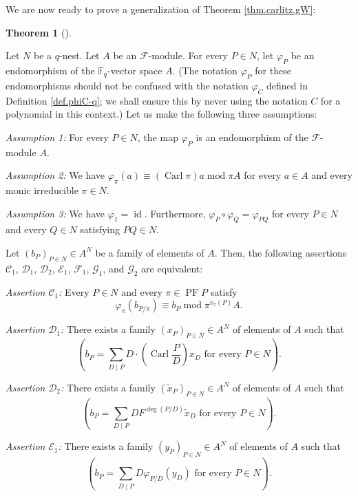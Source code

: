\documentclass[numbers=enddot,12pt,final,onecolumn,notitlepage]{scrartcl}%
\theoremstyle{definition}
\newtheorem{theo}{Theorem}[section]
\newenvironment{theorem}[1][]
{\begin{theo}[#1]\begin{leftbar}}
{\end{leftbar}\end{theo}}
\let\sumnonlimits\sum
\renewcommand{\sum}{\sumnonlimits\limits}
\begin{document}
We are now ready to prove a generalization of Theorem \ref{thm.carlitz.gW}:


\begin{theorem}
\label{thm.F.gW}Let $N$ be a $q$-nest. Let $A$ be an $\mathcal{F}$-module. For
every $P\in N$, let $\varphi_{P}$ be an endomorphism of the $\mathbb{F}_{q}%
$-vector space $A$. (The notation $\varphi_{P}$ for these endomorphisms should
not be confused with the notation $\varphi_{C}$ defined in Definition
\ref{def.phiC-q}; we shall ensure this by never using the notation $C$ for a
polynomial in this context.) Let us make the following three assumptions:

\textit{Assumption 1:} For every $P\in N$, the map $\varphi_{P}$ is an
endomorphism of the $\mathcal{F}$-module $A$.

\textit{Assumption 2:} We have $\varphi_{\pi}\left(  a\right)  \equiv\left(
\operatorname*{Carl}\pi\right)  a\operatorname{mod}\pi A$ for every $a\in A$
and every monic irreducible $\pi\in N$.

\textit{Assumption 3:} We have $\varphi_{1}=\operatorname*{id}$. Furthermore,
$\varphi_{P}\circ\varphi_{Q}=\varphi_{PQ}$ for every $P\in N$ and every $Q\in
N$ satisfying $PQ\in N$.

Let $\left(  b_{P}\right)  _{P\in N}\in A^{N}$ be a family of elements of $A$.
Then, the following assertions $\mathcal{C}_{1}$, $\mathcal{D}_{1}$,
$\mathcal{D}_{2}$, $\mathcal{E}_{1}$, $\mathcal{F}_{1}$, $\mathcal{G}_{1}$,
and $\mathcal{G}_{2}$ are equivalent:

\textit{Assertion }$\mathcal{C}_{1}$\textit{:} Every $P\in N$ and every
$\pi\in\operatorname{PF}P$ satisfy%
\[
\varphi_{\pi}\left(  b_{P / \pi}\right)  \equiv b_{P}\operatorname{mod}%
\pi^{v_{\pi}\left(  P\right)  }A.
\]


\textit{Assertion }$\mathcal{D}_{1}$\textit{:} There exists a family $\left(
x_{P}\right)  _{P\in N}\in A^{N}$ of elements of $A$ such that%
\[
\left(  b_{P}=\sum_{D\mid P}D\cdot\left(  \operatorname*{Carl}\dfrac{P}%
{D}\right)  x_{D}\text{ for every }P\in N\right)  .
\]


\textit{Assertion }$\mathcal{D}_{2}$\textit{:} There exists a family $\left(
\widetilde{x}_{P}\right)  _{P\in N}\in A^{N}$ of elements of $A$ such that%
\[
\left(  b_{P}=\sum_{D\mid P}DF^{\deg\left(  P/D\right)  }\widetilde{x}%
_{D}\text{ for every }P\in N\right)  .
\]


\textit{Assertion }$\mathcal{E}_{1}$\textit{:} There exists a family $\left(
y_{P}\right)  _{P\in N}\in A^{N}$ of elements of $A$ such that%
\[
\left(  b_{P}=\sum_{D\mid P}D\varphi_{P / D}\left(  y_{D}\right)  \text{ for
every }P\in N\right)  .
\]



\end{theorem}
\end{document}
